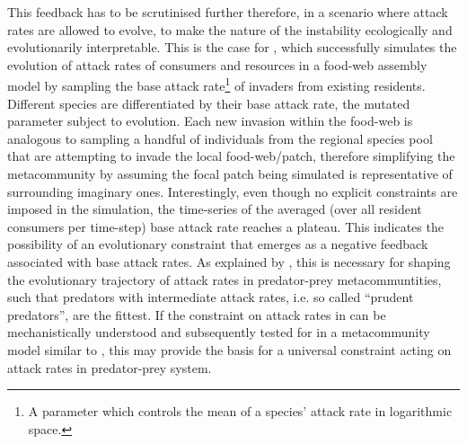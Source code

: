 \documentclass[a4paper]{report}
\begin{document}
This feedback has to be scrutinised further therefore, in a scenario where attack rates are allowed to evolve, to make the nature of the instability ecologically and evolutionarily interpretable. This is the case for \citep{Rossberg2008}, which successfully simulates the evolution of attack rates of consumers and resources in a food-web assembly model by sampling the base attack rate\footnote{A parameter which controls the mean of a species’ attack rate in logarithmic space.} of invaders from existing residents. Different species are differentiated by their base attack rate, the mutated parameter subject to evolution. Each new invasion within the food-web is analogous to sampling a handful of individuals from the regional species pool that are attempting to invade the local food-web/patch, therefore simplifying the metacommunity by assuming the focal patch being simulated is representative of surrounding imaginary ones. Interestingly, even though no explicit constraints are imposed in the simulation, the time-series of the averaged (over all resident consumers per time-step) base attack rate reaches a plateau. This indicates the possibility of an evolutionary constraint that emerges as a negative feedback associated with base attack rates. As explained by \citep{Goodnight2008}, this is necessary for shaping the evolutionary trajectory of attack rates in predator-prey metacommuntities, such that predators with intermediate attack rates, i.e. so called “prudent predators”, are the fittest. If the constraint on attack rates in \citep{Rossberg2008} can be mechanistically understood and subsequently tested for in a metacommunity model similar to \citep{Goodnight2008}, this may provide the basis for a universal constraint acting on attack rates in predator-prey system. \\
\end{document}
